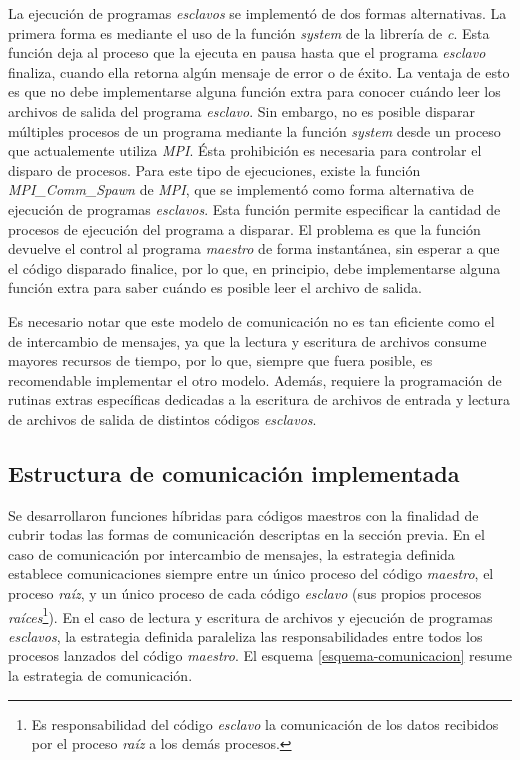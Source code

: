 La ejecución de programas \textit{esclavos} se implementó de dos formas alternativas.
La primera forma es mediante el uso de la función \textit{system} de la librería de \textit{c}.
Esta función deja al proceso que la ejecuta en pausa hasta que el programa \textit{esclavo} finaliza, cuando ella retorna algún mensaje de error o de éxito.
La ventaja de esto es que no debe implementarse alguna función extra para conocer cuándo leer los archivos de salida del programa \textit{esclavo}.
Sin embargo, no es posible disparar múltiples procesos de un programa mediante la función \textit{system} desde un proceso que actualemente utiliza \textit{MPI}.
Ésta prohibición es necesaria para controlar el disparo de procesos.
Para este tipo de ejecuciones, existe la función \textit{MPI\_Comm\_Spawn} de \textit{MPI}, que se implementó como forma alternativa de ejecución de programas \textit{esclavos}.
Esta función permite especificar la cantidad de procesos de ejecución del programa a disparar.
El problema es que la función devuelve el control al programa \textit{maestro} de forma instantánea, sin esperar a que el código disparado finalice,
por lo que, en principio, debe implementarse alguna función extra para saber cuándo es posible leer el archivo de salida.

Es necesario notar que este modelo de comunicación no es tan eficiente como el de intercambio de mensajes,
ya que la lectura y escritura de archivos consume mayores recursos de tiempo, por lo que, siempre que fuera posible, es recomendable implementar el otro modelo.
Además, requiere la programación de rutinas extras específicas dedicadas a la escritura de archivos de entrada y lectura de archivos de salida de distintos códigos \textit{esclavos}.

\subsection*{Estructura de comunicación implementada}
\label{2:estructura}

Se desarrollaron funciones híbridas para códigos maestros con la finalidad de cubrir todas las formas de comunicación descriptas en la sección previa.
En el caso de comunicación por intercambio de mensajes, 
la estrategia definida establece comunicaciones siempre entre un único proceso del código \textit{maestro}, el proceso \textit{raíz},
y un único proceso de cada código \textit{esclavo} (sus propios procesos \textit{raíces}\footnote{
Es responsabilidad del código \textit{esclavo} la comunicación de los datos recibidos por el proceso \textit{raíz} a los demás procesos.
}).
En el caso de lectura y escritura de archivos y ejecución de programas \textit{esclavos},
la estrategia definida paraleliza las responsabilidades entre todos los procesos lanzados del código \textit{maestro}.
El esquema \ref{esquema-comunicacion} resume la estrategia de comunicación.


